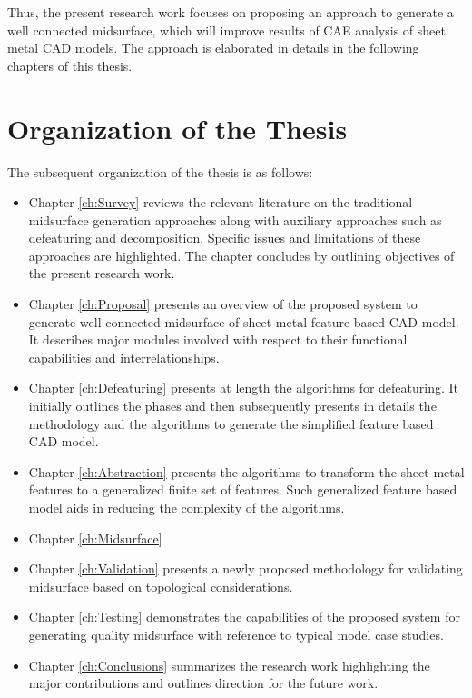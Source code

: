 Thus, the present research work focuses on proposing an approach to generate a well connected midsurface, which will improve results of CAE analysis of sheet metal CAD models. The approach is elaborated in details in the following chapters of this thesis.

\section{Organization of the Thesis}

The subsequent organization of the thesis is as follows:

\begin{itemize}[label={},leftmargin=*]

\item Chapter  \ref{ch:Survey} reviews the relevant literature on the traditional midsurface generation approaches along with auxiliary approaches such as defeaturing and decomposition. Specific issues and limitations of these approaches are highlighted. The chapter concludes by outlining objectives of the present research work.

\item Chapter \ref{ch:Proposal} presents an overview of the proposed system to generate well-connected midsurface of sheet metal feature based CAD model. It describes major modules involved with respect to their functional capabilities and interrelationships.

\item Chapter \ref{ch:Defeaturing} presents at length the algorithms for defeaturing.  It initially outlines the phases and then subsequently presents in details the methodology and the algorithms to generate the simplified feature based CAD model.

\item Chapter \ref{ch:Abstraction} presents the algorithms to transform the sheet metal features to a generalized finite set of features. Such generalized feature based model aids in reducing the complexity of the algorithms.

\item Chapter \ref{ch:Midsurface} 

\item Chapter \ref{ch:Validation} presents a newly proposed methodology for validating midsurface based on topological considerations.

\item Chapter \ref{ch:Testing} demonstrates the capabilities of the proposed system for generating quality midsurface with reference to typical model case studies.

\item Chapter \ref{ch:Conclusions} summarizes the research work highlighting the major contributions and outlines direction for the future work.
\end{itemize}



